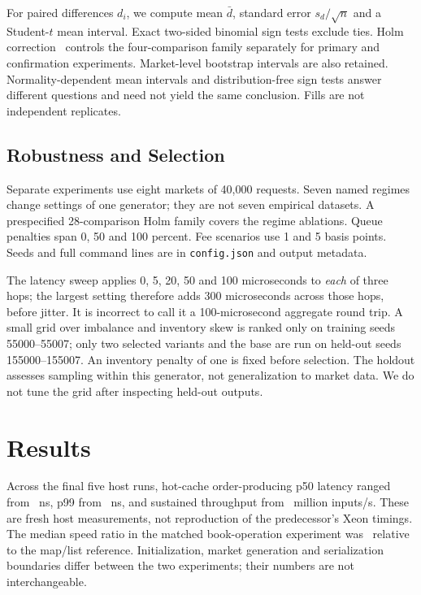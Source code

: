 \documentclass[conference]{IEEEtran}
\begin{document}
For paired differences $d_i$, we compute mean $\bar d$, standard error $s_d/\sqrt n$ and a Student-$t$ mean interval. Exact two-sided binomial sign tests exclude ties. Holm correction~\cite{holm1979} controls the four-comparison family separately for primary and confirmation experiments. Market-level bootstrap intervals are also retained. Normality-dependent mean intervals and distribution-free sign tests answer different questions and need not yield the same conclusion. Fills are not independent replicates.

\subsection{Robustness and Selection}
Separate experiments use eight markets of 40,000 requests. Seven named regimes change settings of one generator; they are not seven empirical datasets. A prespecified 28-comparison Holm family covers the regime ablations. Queue penalties span 0, 50 and 100 percent. Fee scenarios use 1 and 5 basis points. Seeds and full command lines are in \texttt{config.json} and output metadata.

The latency sweep applies 0, 5, 20, 50 and 100 microseconds to \emph{each} of three hops; the largest setting therefore adds 300 microseconds across those hops, before jitter. It is incorrect to call it a 100-microsecond aggregate round trip. A small grid over imbalance and inventory skew is ranked only on training seeds 55000--55007; only two selected variants and the base are run on held-out seeds 155000--155007. An inventory penalty of one is fixed before selection. The holdout assesses sampling within this generator, not generalization to market data. We do not tune the grid after inspecting held-out outputs.

\section{Results}
Across the final five host runs, hot-cache order-producing p50 latency ranged from \HotMedianRange\ ns, p99 from \HotPninetyRange\ ns, and sustained throughput from \ThroughputRange\ million inputs/s. These are fresh host measurements, not reproduction of the predecessor's Xeon timings. The median speed ratio in the matched book-operation experiment was \BookSpeedup\ relative to the map/list reference. Initialization, market generation and serialization boundaries differ between the two experiments; their numbers are not interchangeable.
\end{document}
